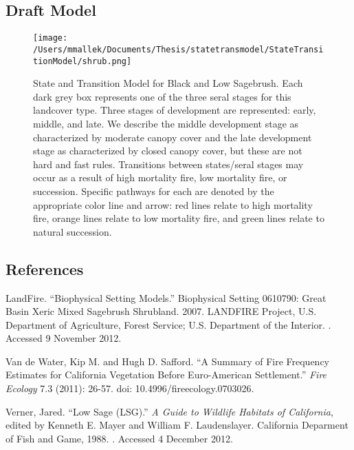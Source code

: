 \subsection*{Draft Model}
\begin{figure}[htbp]
\centering
\texttt{[image: /Users/mmallek/Documents/Thesis/statetransmodel/StateTransitionModel/shrub.png]}
\caption{State and Transition Model for Black and Low Sagebrush. Each dark grey box represents one of the three seral stages for this landcover type. Three stages of development are represented: early, middle, and late. We describe the middle development stage as characterized by moderate canopy cover and the late development stage as characterized by closed canopy cover, but these are not hard and fast rules. Transitions between states/seral stages may occur as a result of high mortality fire, low mortality fire, or succession. Specific pathways for each are denoted by the appropriate color line and arrow: red lines relate to high mortality fire, orange lines relate to low mortality fire, and green lines relate to natural succession.} 
\label{lsg_transmodel}
\end{figure}

\clearpage
\subsection*{References}
\begin{hangparas}{.25in}{1} LandFire. ``Biophysical Setting Models.'' Biophysical Setting 0610790: Great Basin Xeric Mixed Sagebrush Shrubland. 2007. LANDFIRE Project, U.S. Department of Agriculture, Forest Service; U.S. Department of the Interior. . Accessed 9 November 2012.

Van de Water, Kip M. and Hugh D. Safford. ``A Summary of Fire Frequency Estimates for California Vegetation Before Euro-American Settlement.'' \emph{Fire Ecology} 7.3 (2011): 26-57. doi: 10.4996/fireecology.0703026.

Verner, Jared. ``Low Sage (LSG).'' \emph{A Guide to Wildlife Habitats of California}, edited by Kenneth E. Mayer and William F. Laudenslayer. California Deparment of Fish and Game, 1988. . Accessed 4 December 2012.
\end{hangparas}


